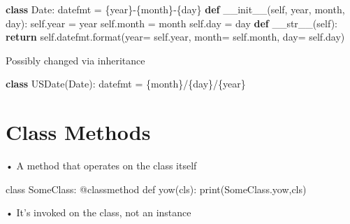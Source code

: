 \documentclass[
  letterpaper,
  DIV=11,
  numbers=noendperiod]{scrreprt}
\newenvironment{Shaded}{\begin{snugshade}}{\end{snugshade}}
\newcommand{\BuiltInTok}[1]{\textcolor[rgb]{0.00,0.23,0.31}{#1}}
\newcommand{\ControlFlowTok}[1]{\textcolor[rgb]{0.00,0.23,0.31}{\textbf{#1}}}
\newcommand{\FunctionTok}[1]{\textcolor[rgb]{0.28,0.35,0.67}{#1}}
\newcommand{\KeywordTok}[1]{\textcolor[rgb]{0.00,0.23,0.31}{\textbf{#1}}}
\newcommand{\NormalTok}[1]{\textcolor[rgb]{0.00,0.23,0.31}{#1}}
\newcommand{\OperatorTok}[1]{\textcolor[rgb]{0.37,0.37,0.37}{#1}}
\newcommand{\SpecialCharTok}[1]{\textcolor[rgb]{0.37,0.37,0.37}{#1}}
\newcommand{\StringTok}[1]{\textcolor[rgb]{0.13,0.47,0.30}{#1}}
\newcommand{\VariableTok}[1]{\textcolor[rgb]{0.07,0.07,0.07}{#1}}
\begin{document}
\begin{Shaded}
\begin{Highlighting}[]
\KeywordTok{class}\NormalTok{ Date: datefmt }\OperatorTok{=} \StringTok{\textquotesingle{}}\SpecialCharTok{\{year\}}\StringTok{{-}}\SpecialCharTok{\{month\}}\StringTok{{-}}\SpecialCharTok{\{day\}}\StringTok{\textquotesingle{}} \KeywordTok{def} \FunctionTok{\_\_init\_\_}\NormalTok{(}\VariableTok{self}\NormalTok{, year, month, day): }\VariableTok{self}\NormalTok{.year }\OperatorTok{=}\NormalTok{ year }\VariableTok{self}\NormalTok{.month }\OperatorTok{=}\NormalTok{ month }\VariableTok{self}\NormalTok{.day }\OperatorTok{=}\NormalTok{ day }\KeywordTok{def} \FunctionTok{\_\_str\_\_}\NormalTok{(}\VariableTok{self}\NormalTok{): }\ControlFlowTok{return} \VariableTok{self}\NormalTok{.datefmt.}\BuiltInTok{format}\NormalTok{(year}\OperatorTok{=} \VariableTok{self}\NormalTok{.year, month}\OperatorTok{=} \VariableTok{self}\NormalTok{.month, day}\OperatorTok{=} \VariableTok{self}\NormalTok{.day) }
\end{Highlighting}
\end{Shaded}

Possibly changed via inheritance

\begin{Shaded}
\begin{Highlighting}[]
\KeywordTok{class}\NormalTok{ USDate(Date):}
\NormalTok{    datefmt }\OperatorTok{=} \StringTok{\textquotesingle{}}\SpecialCharTok{\{month\}}\StringTok{\textquotesingle{}}\OperatorTok{/}\NormalTok{\{day\}}\StringTok{\textquotesingle{}/}\SpecialCharTok{\{year\}}\StringTok{\textquotesingle{}} 
\end{Highlighting}
\end{Shaded}


\chapter{Class Methods}\label{class-methods}

• A method that operates on the class itself

\begin{Shaded}
\begin{Highlighting}[]
\NormalTok{class SomeClass: @classmethod def yow(cls): print(\textquotesingle{}SomeClass.yow\textquotesingle{},cls) }
\end{Highlighting}
\end{Shaded}

• It's invoked on the class, not an instance
\end{document}
